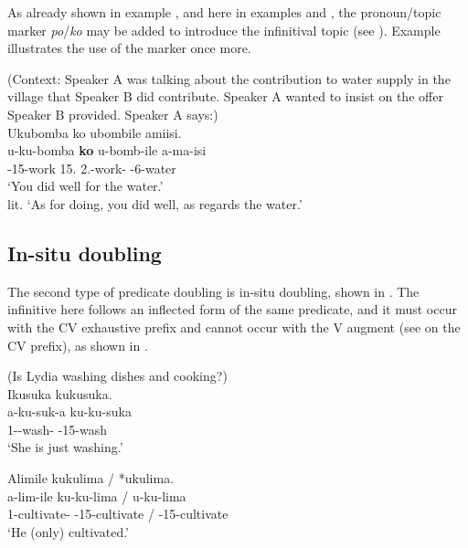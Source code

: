 \documentclass[output=paper]{langscibook}
\begin{document}
\z


As already shown in example , and here in examples  and , the pronoun/topic marker \textit{po}/\textit{ko} may be added to introduce the infinitival topic (see ). Example  illustrates the use of the marker once more.\largerpage[-1]\pagebreak

\ea
\label{bkm:Ref122522407}
(Context: Speaker A was talking about the contribution to water supply in the village that Speaker B did contribute. Speaker A wanted to insist on the offer Speaker B provided. Speaker A says:)\\
Ukubomba ko ubombile amiisi.\\
\gll
u-ku-bomba  \textbf{ko}  u-bomb-ile  a-ma-isi\\
\AUG{}-15-work  15.\PRO{}  2\SG.\SM{}-work-\PFV{}  \AUG{}-6-water\\
\glt
‘You did well for the water.’\\
lit. ‘As for doing, you did well, as regards the water.’

\z

\subsection{In-situ doubling}
\label{bkm:Ref123889421}
The second type of predicate doubling is in-situ doubling, shown in . The infinitive here follows an inflected form of the same predicate, and it must occur with the CV exhaustive prefix and cannot occur with the V augment (see  on the CV prefix), as shown in .

\ea
\label{bkm:Ref122522414}
(Is Lydia washing dishes and cooking?)\\
Ikusuka kukusuka.\\
\gll
a-ku-suk-a  ku-ku-suka\\
1\SM{}-\PRS{}-wash-\FV{}  \EXH{}-15-wash\\
\glt
‘She is just washing.’\\

\z


\ea
\label{bkm:Ref122533092}
Alimile kukulima / *ukulima.\\
\gll
a-lim-ile  ku-ku-lima   / u-ku-lima\\
1\SM{}-cultivate-\PFV{}  \EXH{}-15-cultivate  / \AUG{}-15-cultivate\\
\glt
‘He (only) cultivated.’\\
\end{document}
